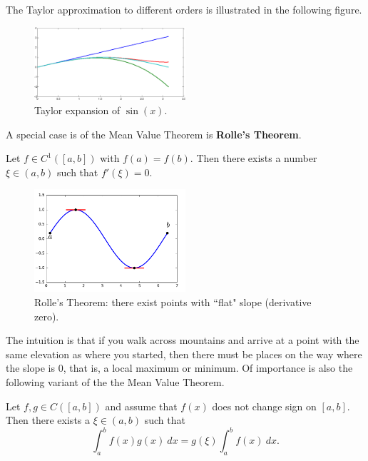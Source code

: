 The Taylor approximation to different orders is illustrated in the following figure.

\begin{center}
\begin{figure}[h!]
\centering
\includegraphics[width=0.5\textwidth]{images/sine-crop.pdf}
\caption{\small Taylor expansion of $\sin(x)$.}
\end{figure}
\end{center}

A special case is of the Mean Value Theorem is \textbf{Rolle's Theorem}.

\begin{theorem*}
Let $f\in C^1([a,b])$ with $f(a) = f(b)$. Then there exists 
a number $\xi\in (a,b)$ such that $f'(\xi) = 0$.
\end{theorem*}

\begin{figure}[h!]
\centering
\includegraphics[width=0.5\textwidth]{images/rolle.pdf}
\caption{\small Rolle's Theorem: there exist points with ``flat" slope (derivative zero).}
\end{figure}

The intuition is that if you walk across mountains and arrive at a point with the same elevation as where you started, then there must be places on the way where the slope is $0$, that is, a local maximum or minimum. Of importance is also the following variant of the the Mean Value Theorem.

\begin{theorem*}
Let $f,g\in C([a,b])$ and assume that $f(x)$ does not change sign on $[a,b]$. Then
there exists a $\xi\in (a,b)$ such that
\begin{equation*}
  \int_a^b f(x)g(x) \ dx = g(\xi) \int_a^b f(x) \ dx.
\end{equation*}
\end{theorem*}

